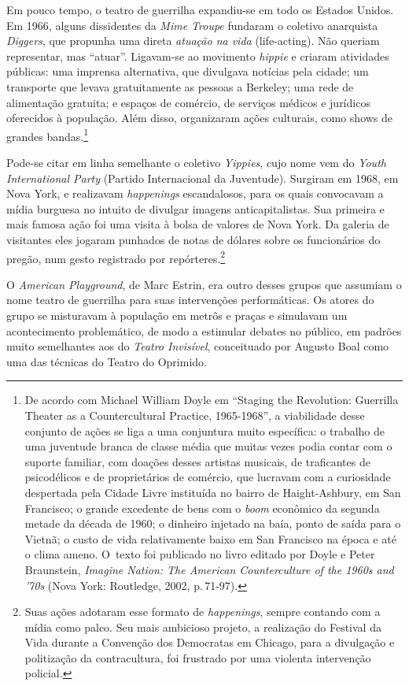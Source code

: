 {Em pouco tempo, o teatro de guerrilha expandiu-se em todo os
Estados Unidos. Em 1966, alguns dissidentes da {\it Mime Troupe} fundaram o
coletivo anarquista {\it Diggers}, que propunha uma direta {\it atuação
na vida} (life-acting). Não queriam representar, mas “atuar”.
Ligavam-se ao movimento {\it hippie} e criaram atividades públicas: uma
imprensa alternativa, que divulgava notícias pela cidade; um transporte
que levava gratuitamente as pessoas a Berkeley; uma rede de alimentação
gratuita; e espaços de comércio, de serviços médicos e jurídicos
oferecidos à população. Além disso, organizaram ações culturais, como
shows de grandes bandas.\footnote{De acordo com Michael William Doyle em
  “Staging the Revolution: Guerrilla Theater as a Countercultural
  Practice, 1965-1968”, a viabilidade desse conjunto de ações se liga a
  uma conjuntura muito específica: o trabalho de uma juventude branca de
  classe média que muitas vezes podia contar com o suporte familiar, com
  doações desses artistas musicais, de traficantes de psicodélicos
  e de proprietários de comércio, que lucravam com a curiosidade
  despertada pela Cidade Livre instituída no bairro de Haight-Ashbury,
  em San Francisco; o grande excedente de bens com o {\it boom}
  econômico da segunda metade da década de 1960; o dinheiro injetado na
  baía, ponto de saída para o Vietnã; o custo de vida relativamente
  baixo em San Francisco na época e até o clima ameno. O~texto foi
  publicado no livro editado por Doyle e Peter Braunstein, {\it Imagine
  Nation: The American Counterculture of the 1960s and '70s} (Nova York:
  Routledge, 2002, p.\,71-97).}

Pode-se citar em linha semelhante o coletivo {\it Yippies}, cujo nome
vem do {\it Youth International Party} (Partido Internacional da
Juventude). Surgiram em 1968, em Nova York, e realizavam
{\it happenings} escandalosos, para os quais convocavam a mídia
burguesa no intuito de divulgar imagens anticapitalistas. Sua
primeira e mais famosa ação foi uma visita à bolsa de valores de Nova
York. Da galeria de visitantes eles jogaram punhados de notas de
dólares sobre os funcionários do pregão, num gesto registrado por
repórteres.\footnote{Suas ações adotaram esse formato de
  {\it happenings}, sempre contando com a mídia como palco. Seu mais
  ambicioso projeto, a realização do Festival da Vida durante a
  Convenção dos Democratas em Chicago, para a divulgação e
  politização da contracultura, foi frustrado por uma violenta
  intervenção policial.}

O {\it American Playground}, de Marc Estrin, era outro desses grupos que
assumiam o nome teatro de guerrilha para suas intervenções
performáticas. Os atores do grupo se misturavam à população em metrôs e
praças e simulavam um acontecimento problemático, de modo a estimular
debates no público, em padrões muito semelhantes aos do
{\it Teatro Invisível}, conceituado por Augusto Boal como uma das
técnicas do Teatro do Oprimido.

}
